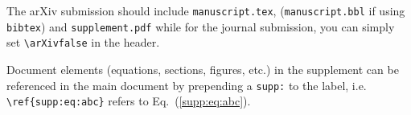 \documentclass[10pt,twocolumn,prl,aps,floatfix,superscriptaddress,longbibliography]{revtex4-1}
\def\supplementfilename{supplement}
\def\numbersupplementpages{\the\pdflastximagepages}
\newif\ifarXiv
\begin{document}
The arXiv submission should include \texttt{manuscript.tex},
(\texttt{manuscript.bbl} if using \texttt{bibtex}) and
\texttt{supplement.pdf} while for the journal submission, you can simply
set \verb!\arXivfalse! in the header.

Document elements (equations, sections, figures, etc.) in the supplement can be referenced in the main document by prepending a \texttt{supp:} to the label, i.e. \verb!\ref{supp:eq:abc}! refers to Eq.~(\ref{supp:eq:abc}).



\ifarXiv
    \foreach \x in {1,...,\numbersupplementpages}
    {
        \clearpage
        
    }
\fi
\end{document}
